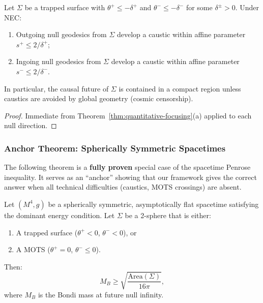 \begin{corollary}
\label{cor:trapped-focusing-time}
Let $\Sigma$ be a trapped surface with $\theta^+ \leq -\delta^+$ and $\theta^- \leq -\delta^-$ for some $\delta^\pm > 0$. Under NEC:
\begin{enumerate}[label=(\roman*)]
\item Outgoing null geodesics from $\Sigma$ develop a caustic within affine parameter $s^+ \leq 2/\delta^+$;
\item Ingoing null geodesics from $\Sigma$ develop a caustic within affine parameter $s^- \leq 2/\delta^-$.
\end{enumerate}
In particular, the causal future of $\Sigma$ is contained in a compact region unless caustics are avoided by global geometry (cosmic censorship).
\end{corollary}

\begin{proof}
Immediate from Theorem~\ref{thm:quantitative-focusing}(a) applied to each null direction.
\end{proof}

\subsubsection{Anchor Theorem: Spherically Symmetric Spacetimes}

The following theorem is a \textbf{fully proven} special case of the spacetime Penrose inequality. It serves as an ``anchor'' showing that our framework gives the correct answer when all technical difficulties (caustics, MOTS crossings) are absent.

\begin{theorem}
\label{thm:spherical-penrose-anchor}
Let $(M^4, g)$ be a spherically symmetric, asymptotically flat spacetime satisfying the dominant energy condition. Let $\Sigma$ be a 2-sphere that is either:
\begin{enumerate}[label=(\alph*)]
\item A trapped surface ($\theta^+ < 0$, $\theta^- < 0$), or
\item A MOTS ($\theta^+ = 0$, $\theta^- \le 0$).
\end{enumerate}
Then:
\begin{equation}
M_B \geq \sqrt{\frac{\mathrm{Area}(\Sigma)}{16\pi}},
\end{equation}
where $M_B$ is the Bondi mass at future null infinity.
\end{theorem}

